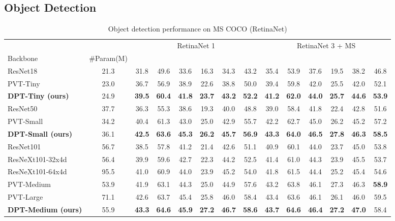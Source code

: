 \documentclass[sigconf,screen]{acmart}
\begin{document}
\subsection{Object Detection}
\begin{table*}
  \caption{Object detection performance on MS COCO (RetinaNet)}
  \label{tab:det_retina_result}
  \begin{tabular}{l|c|cccccc|cccccc}
    \toprule
     & & \multicolumn{6}{c}{RetinaNet 1} & \multicolumn{6}{c}{RetinaNet 3 + MS}\\
    Backbone & \#Param(M) &  &  &  &  &  &  &  &  &  &  &  & \\
    \midrule
    ResNet18 \cite{resnet}& 21.3 & 31.8 & 49.6 & 33.6 & 16.3 & 34.3 & 43.2 & 35.4 & 53.9 & 37.6 & 19.5 & 38.2 & 46.8\\
    PVT-Tiny \cite{pvt}   & 23.0 & 36.7 & 56.9 & 38.9 & 22.6 & 38.8 & 50.0 & 39.4 & 59.8 & 42.0 & 25.5 & 42.0 & 52.1\\
    \textbf{DPT-Tiny (ours)}       & 24.9 & \textbf{39.5} & \textbf{60.4} & \textbf{41.8} & \textbf{23.7} & \textbf{43.2} & \textbf{52.2} & \textbf{41.2} & \textbf{62.0} & \textbf{44.0} & \textbf{25.7} & \textbf{44.6} & \textbf{53.9}\\
    \midrule
    ResNet50 \cite{resnet}& 37.7 & 36.3 & 55.3 & 38.6 & 19.3 & 40.0 & 48.8 & 39.0 & 58.4 & 41.8 & 22.4 & 42.8 & 51.6\\
    PVT-Small \cite{pvt}  & 34.2 & 40.4 & 61.3 & 43.0 & 25.0 & 42.9 & 55.7 & 42.2 & 62.7 & 45.0 & 26.2 & 45.2 & 57.2\\
    \textbf{DPT-Small (ours)}      & 36.1 & \textbf{42.5} & \textbf{63.6} & \textbf{45.3} & \textbf{26.2} & \textbf{45.7} & \textbf{56.9} & \textbf{43.3} & \textbf{64.0} & \textbf{46.5} & \textbf{27.8} & \textbf{46.3} & \textbf{58.5}\\
    \midrule
    ResNet101 \cite{resnet}        & 56.7  &  38.5 & 57.8 & 41.2 & 21.4 & 42.6 & 51.1  &  40.9 & 60.1 & 44.0 & 23.7 & 45.0 & 53.8\\
    ResNeXt101-32x4d \cite{resnext}& 56.4  &  39.9 & 59.6 & 42.7 & 22.3 & 44.2 & 52.5  &  41.4 & 61.0 & 44.3 & 23.9 & 45.5 & 53.7\\
    ResNeXt101-64x4d \cite{resnext} & 95.5 &  41.0 & 60.9 & 44.0 & 23.9 & 45.2 & 54.0  &  41.8 & 61.5 & 44.4 & 25.2 & 45.4 & 54.6\\
    PVT-Medium \cite{pvt}          & 53.9  &  41.9 & 63.1 & 44.3 & 25.0 & 44.9 & 57.6  &  43.2 & 63.8 & 46.1 & 27.3 & 46.3 & \textbf{58.9}\\
    PVT-Large \cite{pvt}            & 71.1 &  42.6 & 63.7 & 45.4 & 25.8 & 46.0 & 58.4  &  43.4 & 63.6 & 46.1 & 26.1 & 46.0 & 59.5\\
    \textbf{DPT-Medium (ours)}     & 55.9  &  \textbf{43.3} & \textbf{64.6} & \textbf{45.9} & \textbf{27.2} & \textbf{46.7} & \textbf{58.6}  &  \textbf{43.7} & \textbf{64.6} & \textbf{46.4} & \textbf{27.2} & \textbf{47.0} & 58.4\\
  \bottomrule
\end{tabular}
\end{table*}
\end{document}
